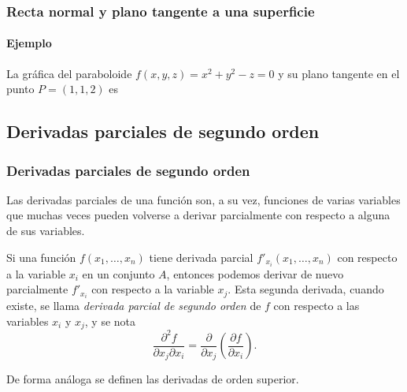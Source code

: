 \begin{frame}
	\frametitle{Recta normal y plano tangente a una superficie}
	\framesubtitle{Ejemplo}
	La gráfica del paraboloide $f(x,y,z)=x^2+y^2-z=0$ y su plano tangente en el punto $P=(1,1,2)$ es 
	\begin{center}
		\scalebox{1}{}
	\end{center}
\end{frame}


\subsection{Derivadas parciales de segundo orden}
\begin{frame}
	\frametitle{Derivadas parciales de segundo orden}
	Las derivadas parciales de una función son, a su vez, funciones de varias variables que muchas veces pueden volverse a
	derivar parcialmente con respecto a alguna de sus variables. 
	
	Si una función $f(x_1,\ldots,x_n)$ tiene derivada parcial $f'_{x_i}(x_1,\ldots,x_n)$ con respecto a la variable $x_i$ en un conjunto $A$, entonces podemos derivar de nuevo parcialmente $f'_{x_i}$ con respecto a la variable $x_j$. Esta segunda derivada, cuando existe, se llama \emph{derivada parcial de segundo orden} de $f$ con respecto a las variables $x_i$ y $x_j$, y se nota
	\[
		\frac{\partial ^2 f}{\partial x_j \partial x_i}= \frac{\partial}{\partial x_j}\left(\frac{\partial f}{\partial x_i}\right).
	\]
	
	De forma análoga se definen las derivadas de orden superior.
\end{frame}


